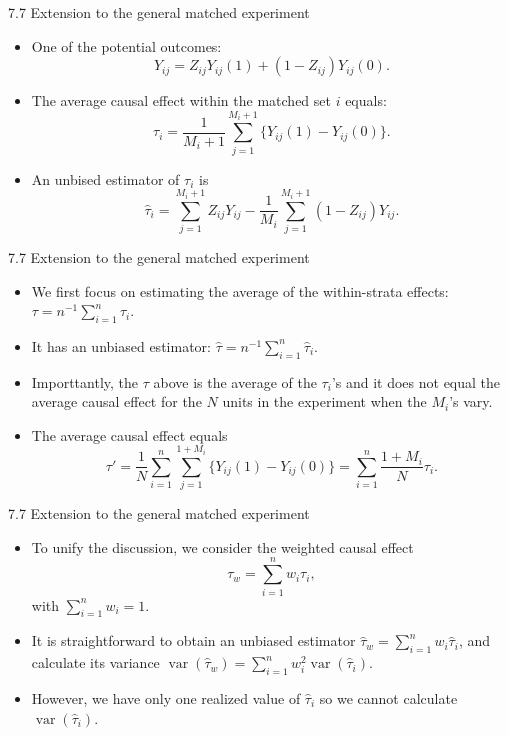 \documentclass[aspectratio=169, 12pt]{beamer}
\begin{document}
\begin{frame}{7.7 Extension to the general matched experiment}
    \begin{itemize}
        \item One of the potential outcomes:
        \[
        Y_{ij}=Z_{ij}Y_{ij}(1) + (1-Z_{ij})Y_{ij}(0).
        \]
        \item The average causal effect within the matched set $i$ equals:
        \[
        \tau_i = \frac{1}{M_i+1}\sum_{j=1}^{M_i+1}\{Y_{ij}(1)-Y_{ij}(0)\}.
        \]
        \item An unbised estimator of $\tau_i$ is
        \[
        \hat{\tau}_i=\sum_{j=1}^{M_i+1}Z_{ij}Y_{ij}-\frac{1}{M_i}\sum_{j=1}^{M_i+1}(1-Z_{ij})Y_{ij}.
        \]
    \end{itemize}
\end{frame}

\begin{frame}{7.7 Extension to the general matched experiment}
    \begin{itemize}
        \item We first focus on estimating the average of the within-strata effects: $\tau=n^{-1}\sum_{i=1}^{n}\tau_i$.
        \item It has an unbiased estimator: $\hat{\tau}=n^{-1}\sum_{i=1}^{n}\hat{\tau}_i$.
        \item Importtantly, the $\tau$ above is the average of the $\tau_i$'s and it does not equal the average causal effect for the $N$ units in the experiment when the $M_i$'s vary.
        \item The average causal effect equals
        \[
        \tau'=\frac{1}{N}\sum_{i=1}^{n}\sum_{j=1}^{1+M_i}\{Y_{ij}(1)-Y_{ij}(0)\} = \sum_{i=1}^{n}\frac{1+M_i}{N}\tau_i.
        \]
    \end{itemize}
\end{frame}

\begin{frame}{7.7 Extension to the general matched experiment}
    \begin{itemize}
        \item To unify the discussion, we consider the weighted causal effect
        \[
        \tau_w = \sum_{i=1}^{n}w_i\tau_i, 
        \]
        with $\sum_{i=1}^{n}w_i=1$.
        \item It is straightforward to obtain an unbiased estimator $\hat{\tau}_w=\sum_{i=1}^{n}w_i\hat{\tau}_i$, and calculate its variance $\operatorname{var}(\hat{\tau}_w)=\sum_{i=1}^{n}w_i^2\operatorname{var}(\hat{\tau}_i)$.
        \item However, we have only one realized value of $\hat{\tau}_i$ so we cannot calculate $\operatorname{var}(\hat{\tau}_i)$.
    \end{itemize}
\end{frame}
\end{document}

